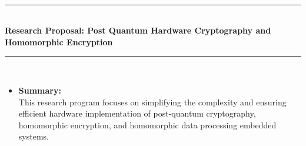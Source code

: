  \thispagestyle{empty}
 \phantom \quad \\
\hrule \phantom \quad  \vspace*{1\baselineskip}  \\
 {\bf Research Proposal: Post Quantum Hardware Cryptography and Homomorphic  Encryption}
 \vspace*{1\baselineskip}  \hrule \phantom \quad \\


\begin {itemize}
 \item [$\bullet$] { \bf Summary:} \vspace{0.5em} \\
This research program focuses on simplifying the complexity and ensuring efficient hardware implementation of post-quantum cryptography, homomorphic encryption, and homomorphic data processing embedded systems.


\end{itemize}

